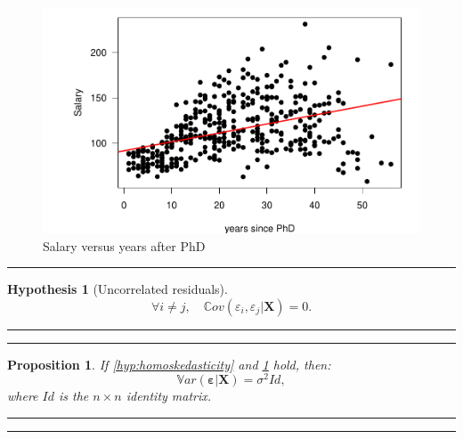 \documentclass[
]{book}
\newtheorem{proposition}{Proposition}[chapter]
\theoremstyle{definition}
\theoremstyle{definition}
\theoremstyle{definition}
\theoremstyle{definition}
\newtheorem{hypothesis}{Hypothesis}[chapter]
\theoremstyle{remark}
\begin{document}
\begin{figure}

{\centering \includegraphics[width=0.9\linewidth]{bookdown-demo_files/figure-latex/exmpSalarayPhD-1} 

}

\caption{Salary versus years after PhD}\label{fig:exmpSalarayPhD}
\end{figure}

\begin{center}\rule{0.5\linewidth}{0.5pt}\end{center}

\begin{hypothesis}[Uncorrelated residuals]
\protect\hypertarget{hyp:noncorrelResid}{}\label{hyp:noncorrelResid}\[
\forall i \ne j, \quad \mathbb{C}ov(\varepsilon_i,\varepsilon_j|\mathbf{X})=0.
\]
\end{hypothesis}

\begin{center}\rule{0.5\linewidth}{0.5pt}\end{center}

\begin{center}\rule{0.5\linewidth}{0.5pt}\end{center}

\begin{proposition}
\protect\hypertarget{prp:Sigma}{}\label{prp:Sigma}If \ref{hyp:homoskedasticity} and \ref{hyp:noncorrelResid} hold, then:
\[
\mathbb{V}ar(\boldsymbol\varepsilon|\mathbf{X})= \sigma^2 Id,
\]
where \(Id\) is the \(n \times n\) identity matrix.
\end{proposition}

\begin{center}\rule{0.5\linewidth}{0.5pt}\end{center}

\begin{center}\rule{0.5\linewidth}{0.5pt}\end{center}
\end{document}

